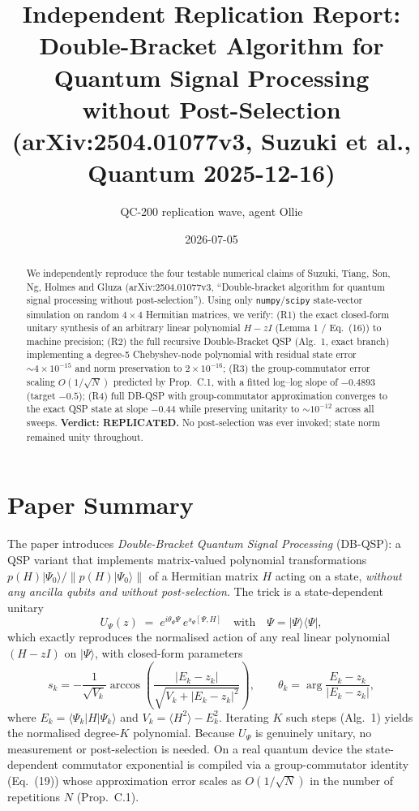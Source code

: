 \documentclass[11pt]{article}
\title{Independent Replication Report:\\
\textbf{Double-Bracket Algorithm for Quantum Signal Processing without Post-Selection}\\
\normalsize (arXiv:2504.01077v3, Suzuki et al., Quantum 2025-12-16)}
\author{QC-200 replication wave, agent Ollie}
\date{2026-07-05}
\begin{document}
\maketitle

\begin{abstract}
We independently reproduce the four testable numerical claims of Suzuki, Tiang, Son, Ng, Holmes and Gluza (arXiv:2504.01077v3, ``Double-bracket algorithm for quantum signal processing without post-selection''). Using only \texttt{numpy}/\texttt{scipy} state-vector simulation on random $4\times 4$ Hermitian matrices, we verify: (R1) the exact closed-form unitary synthesis of an arbitrary linear polynomial $H-zI$ (Lemma 1 / Eq.~(16)) to machine precision; (R2) the full recursive Double-Bracket QSP (Alg.~1, exact branch) implementing a degree-5 Chebyshev-node polynomial with residual state error $\sim 4\times 10^{-15}$ and norm preservation to $2\times 10^{-16}$; (R3) the group-commutator error scaling $O(1/\sqrt{N})$ predicted by Prop.~C.1, with a fitted log--log slope of $-0.4893$ (target $-0.5$); (R4) full DB-QSP with group-commutator approximation converges to the exact QSP state at slope $-0.44$ while preserving unitarity to $\sim 10^{-12}$ across all sweeps. \textbf{Verdict: REPLICATED.} No post-selection was ever invoked; state norm remained unity throughout.
\end{abstract}

\section{Paper Summary}
The paper introduces \emph{Double-Bracket Quantum Signal Processing} (DB-QSP): a QSP variant that implements matrix-valued polynomial transformations $p(H)\lvert\Psi_0\rangle / \lVert p(H)\lvert\Psi_0\rangle\rVert$ of a Hermitian matrix $H$ acting on a state, \emph{without any ancilla qubits and without post-selection}. The trick is a state-dependent unitary
\begin{equation}
U_\Psi(z) \;=\; e^{i\theta_\Psi \Psi} \, e^{s_\Psi [\Psi,H]}
\quad\text{with}\quad
\Psi = \lvert\Psi\rangle\!\langle\Psi\rvert,
\end{equation}
which exactly reproduces the normalised action of any real linear polynomial $(H - zI)$ on $\lvert\Psi\rangle$, with closed-form parameters
\begin{equation}
s_k = -\frac{1}{\sqrt{V_k}} \arccos\!\left(\frac{|E_k - z_k|}{\sqrt{V_k + |E_k - z_k|^2}}\right),
\qquad
\theta_k = \arg\!\frac{E_k - z_k}{|E_k - z_k|},
\end{equation}
where $E_k = \langle\Psi_k \rvert H\lvert\Psi_k\rangle$ and $V_k = \langle H^2\rangle - E_k^2$. Iterating $K$ such steps (Alg.~1) yields the normalised degree-$K$ polynomial. Because $U_\Psi$ is genuinely unitary, no measurement or post-selection is needed. On a real quantum device the state-dependent commutator exponential is compiled via a group-commutator identity (Eq.~(19)) whose approximation error scales as $O(1/\sqrt{N})$ in the number of repetitions $N$ (Prop.~C.1).
\end{document}
